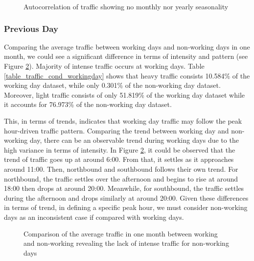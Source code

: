 \begin{figure}[h]
  \centering
  \captionsetup{justification=centering}
  \caption{Autocorrelation of traffic showing no monthly nor yearly seasonality}
  \label{figure_autocorr_traffic_month}
\end{figure}



\subsubsection{Previous Day}

Comparing the average traffic between working days and non-working days in one month, we could see a significant difference in terms of intensity and pattern (see Figure \ref{figure_workingday_comparison}). Majority of intense traffic occurs at working days. Table \ref{table_traffic_cond_workingday} shows that heavy traffic consists 10.584\% of the working day dataset, while only 0.301\% of the non-working day dataset. Moreover, light traffic consists of only 51.819\% of the working day dataset while it accounts for 76.973\% of the non-working day dataset.

This, in terms of trends, indicates that working day traffic may follow the peak hour-driven traffic pattern. Comparing the trend between working day and non-working day, there can be an observable trend during working days due to the high variance in terms of intensity. In Figure \ref{figure_workingday_comparison}, it could be observed that the trend of traffic goes up at around 6:00. From that, it settles as it approaches around 11:00. Then, northbound and southbound follows their own trend. For northbound, the traffic settles over the afternoon and begins to rise at around 18:00 then drops at around 20:00. Meanwhile, for southbound, the traffic settles during the afternoon and drops similarly at around 20:00. Given these differences in terms of trend, in defining a specific peak hour, we must consider non-working days as an inconsistent case if compared with working days.


\begin{figure}[h]
  \centering
  \captionsetup{justification=centering}
  \caption{Comparison of the average traffic in one month between working and non-working revealing the lack of intense traffic for non-working days}
  \label{figure_workingday_comparison}
\end{figure}




